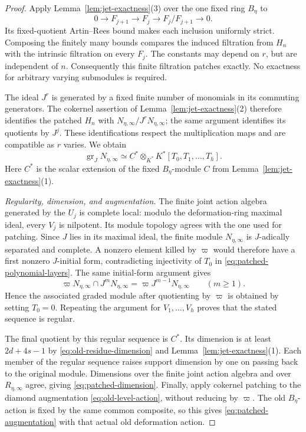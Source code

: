 \begin{proof}
Apply Lemma~\ref{lem:jet-exactness}(3) over the one fixed ring
$B_\eta$ to
\[
 0\longrightarrow F_{j+1}\longrightarrow F_j
 \longrightarrow F_j/F_{j+1}\longrightarrow0.
\]
Its fixed-quotient Artin--Rees bound makes each inclusion uniformly
strict. Composing the finitely many bounds compares the induced
filtration from $H_n$ with the intrinsic filtration on every
$F_j$. The constants may depend on $r$, but are independent of
$n$. Consequently this finite filtration patches exactly. No
exactness for arbitrary varying submodules is required.

The ideal $J^r$ is generated by a fixed finite number of monomials
in its commuting generators. The cokernel assertion of
Lemma~\ref{lem:jet-exactness}(2) therefore identifies the patched
$H_n$ with $N_{\eta,\infty}/J^rN_{\eta,\infty}$; the same
argument identifies its quotients by $J^j$. These identifications
respect the multiplication maps and are compatible as $r$ varies.
We obtain
\begin{equation}\label{eq:patched-polynomial-layers}
 \operatorname{gr}_J N_{\eta,\infty}
       \simeq C^*\otimes_{K^*}K^*[T_0,T_1,\ldots,T_h].
\end{equation}
Here $C^*$ is the scalar extension of the fixed $B_\eta$-module
$C$ from Lemma~\ref{lem:jet-exactness}(1).

\emph{Regularity, dimension, and augmentation.}
The finite joint action algebra generated by the $U_j$ is complete
local: modulo the deformation-ring maximal ideal, every $V_j$ is
nilpotent. Its module topology agrees with the one used for
patching. Since $J$ lies in its maximal ideal, the finite module
$N_{\eta,\infty}$ is $J$-adically separated and complete.
A nonzero element killed by $\varpi$ would therefore have a first
nonzero $J$-initial form, contradicting injectivity of $T_0$ in
\eqref{eq:patched-polynomial-layers}. The same initial-form
argument gives
\[
 \varpi N_{\eta,\infty}\cap J^mN_{\eta,\infty}
       =\varpi J^{m-1}N_{\eta,\infty}\qquad(m\geq1).
\]
Hence the associated graded module after quotienting by $\varpi$
is obtained by setting $T_0=0$. Repeating the argument for
$V_1,\ldots,V_h$ proves that the stated sequence is regular.

The final quotient by this regular sequence is $C^*$. Its dimension
is at least $2d+4s-1$ by \eqref{eq:old-residue-dimension} and
Lemma~\ref{lem:jet-exactness}(1). Each member of the regular
sequence raises support dimension by one on passing back to the
original module. Dimensions over the finite joint action algebra
and over $R_{\eta,\infty}$ agree, giving
\eqref{eq:patched-dimension}.
Finally, apply cokernel patching to the diamond augmentation
\eqref{eq:old-level-action}, without reducing by $\varpi$.
The old $B_\eta$-action is fixed by the same common composite,
so this gives \eqref{eq:patched-augmentation} with that actual
old deformation action.
\end{proof}

